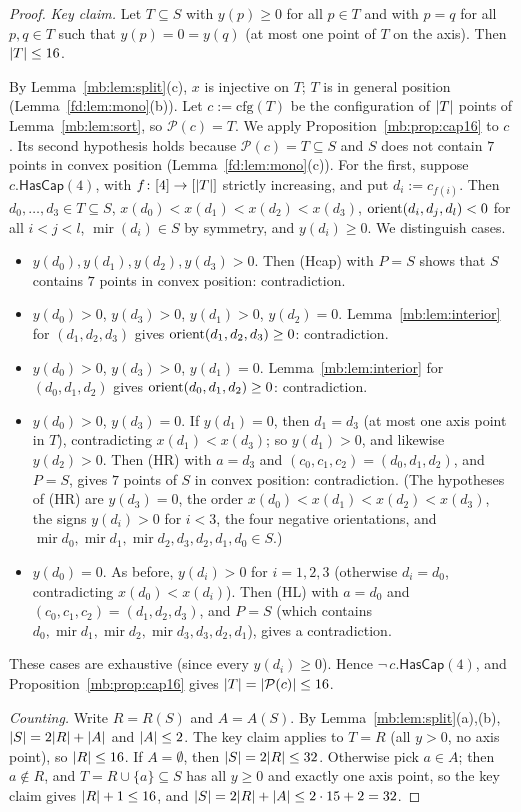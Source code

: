 \begin{proof}
\emph{Key claim.} Let $T\subseteq S$ with $y(p)\ge0$ for all $p\in T$ and with $p=q$ for all $p,q\in T$ such that
$y(p)=0=y(q)$ (at most one point of $T$ on the axis). Then $\lvert T\rvert\le16$.

By Lemma~\ref{mb:lem:split}(c), $x$ is injective on $T$; $T$ is in general position (Lemma~\ref{fd:lem:mono}(b)). Let
$c:=\mathrm{cfg}(T)$ be the configuration of $\lvert T\rvert$ points of Lemma~\ref{mb:lem:sort}, so $\mathcal P(c)=T$. We apply
Proposition~\ref{mb:prop:cap16} to $c$. Its second hypothesis holds because $\mathcal P(c)=T\subseteq S$ and $S$ does not
contain $7$ points in convex position (Lemma~\ref{fd:lem:mono}(c)). For the first, suppose $c.\mathsf{HasCap}(4)$, with
$f\colon[4]\to[\lvert T\rvert]$ strictly increasing, and put $d_i:=c_{f(i)}$. Then $d_0,\dots,d_3\in T\subseteq S$,
$x(d_0)<x(d_1)<x(d_2)<x(d_3)$, $\operatorname{orient}(d_i,d_j,d_l)<0$ for all $i<j<l$, $\operatorname{mir}(d_i)\in S$ by symmetry, and
$y(d_i)\ge0$. We distinguish cases.
\begin{itemize}
\item $y(d_0),y(d_1),y(d_2),y(d_3)>0$. Then (Hcap) with $P=S$ shows that $S$ contains $7$ points in convex position:
  contradiction.
\item $y(d_0)>0$, $y(d_3)>0$, $y(d_1)>0$, $y(d_2)=0$. Lemma~\ref{mb:lem:interior} for $(d_1,d_2,d_3)$ gives
  $\operatorname{orient}(d_1,d_2,d_3)\ge0$: contradiction.
\item $y(d_0)>0$, $y(d_3)>0$, $y(d_1)=0$. Lemma~\ref{mb:lem:interior} for $(d_0,d_1,d_2)$ gives
  $\operatorname{orient}(d_0,d_1,d_2)\ge0$: contradiction.
\item $y(d_0)>0$, $y(d_3)=0$. If $y(d_1)=0$, then $d_1=d_3$ (at most one axis point in $T$), contradicting
  $x(d_1)<x(d_3)$; so $y(d_1)>0$, and likewise $y(d_2)>0$. Then (HR) with $a=d_3$ and $(c_0,c_1,c_2)=(d_0,d_1,d_2)$, and
  $P=S$, gives $7$ points of $S$ in convex position: contradiction. (The hypotheses of (HR) are $y(d_3)=0$, the order
  $x(d_0)<x(d_1)<x(d_2)<x(d_3)$, the signs $y(d_i)>0$ for $i<3$, the four negative orientations, and $\operatorname{mir}
  d_0,\operatorname{mir}d_1,\operatorname{mir}d_2,d_3,d_2,d_1,d_0\in S$.)
\item $y(d_0)=0$. As before, $y(d_i)>0$ for $i=1,2,3$ (otherwise $d_i=d_0$, contradicting $x(d_0)<x(d_i)$). Then (HL) with
  $a=d_0$ and $(c_0,c_1,c_2)=(d_1,d_2,d_3)$, and $P=S$ (which contains $d_0,\operatorname{mir}d_1,\operatorname{mir}d_2,
  \operatorname{mir}d_3,d_3,d_2,d_1$), gives a contradiction.
\end{itemize}
These cases are exhaustive (since every $y(d_i)\ge0$). Hence $\neg\,c.\mathsf{HasCap}(4)$, and
Proposition~\ref{mb:prop:cap16} gives $\lvert T\rvert=\lvert\mathcal P(c)\rvert\le16$.

\emph{Counting.} Write $R=R(S)$ and $A=A(S)$. By Lemma~\ref{mb:lem:split}(a),(b), $\lvert S\rvert=2\lvert R\rvert+\lvert A\rvert$ and
$\lvert A\rvert\le2$. The key claim applies to $T=R$ (all $y>0$, no axis point), so $\lvert R\rvert\le16$. If $A=\emptyset$, then
$\lvert S\rvert=2\lvert R\rvert\le32$. Otherwise pick $a\in A$; then $a\notin R$, and $T=R\cup\{a\}\subseteq S$ has all $y\ge0$ and
exactly one axis point, so the key claim gives $\lvert R\rvert+1\le16$, and $\lvert S\rvert=2\lvert R\rvert+\lvert A\rvert\le2\cdot15+2=32$.
\end{proof}

